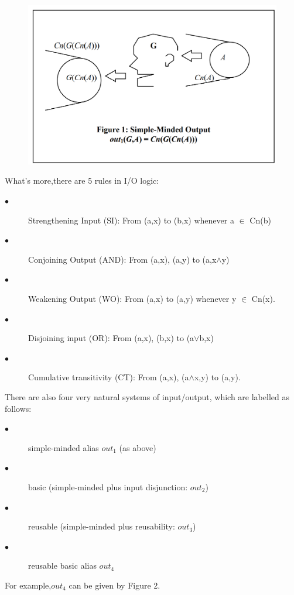 \documentclass{article}
\begin{document}
\begin{figure}[hb]
\centering
\includegraphics[scale=0.4]{simple_minded.png}

\label{fig_framework}
\end{figure}
What's more,there are 5  rules in I/O logic:
\begin{description}
\item[$\bullet$] Strengthening Input (SI): From (a,x) to (b,x) whenever a $\in$ Cn(b)
\item[$\bullet$] Conjoining Output (AND): From (a,x), (a,y) to (a,x$\wedge$y)
\item[$\bullet$] Weakening Output (WO): From (a,x) to (a,y) whenever y $\in$ Cn(x).
\item[$\bullet$] Disjoining input (OR): From (a,x), (b,x) to (a$\vee$b,x)
\item[$\bullet$] Cumulative transitivity (CT): From (a,x), (a$\wedge$x,y) to (a,y).
\end{description}
There are also four very natural systems of input/output, which are labelled as follows: 
\begin{description}
\item[$\bullet$]simple-minded alias $out_{1}$ (as above)
\item[$\bullet$]basic (simple-minded plus input disjunction: $out_{2}$)
\item[$\bullet$]reusable (simple-minded plus reusability: $out_{3}$)
\item[$\bullet$]reusable basic alias $out_{4}$
\end{description}
For example,$out_{4}$ can be given by Figure 2.\\
\newpage
\end{document}
